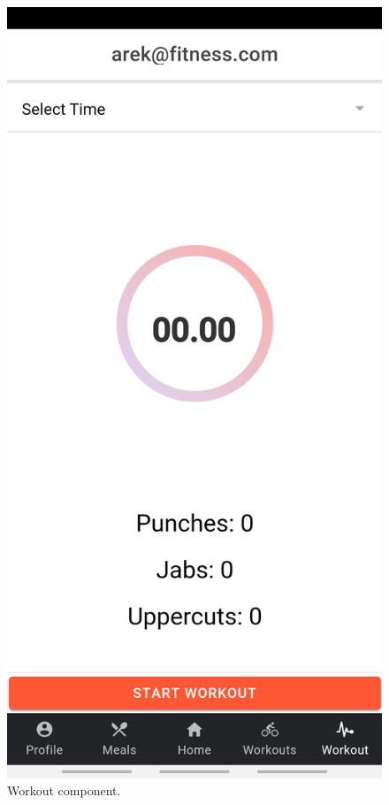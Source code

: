 \documentclass[a4paper,12pt]{report}
\begin{document}
\begin{figure}[ht]
\begin{minipage}[b]{0.5\linewidth}
    \includegraphics[width=.7\linewidth]{images/aplicationImages/workout.jpg} 
    \caption{Workout component.} 
    \vspace{4ex}
  \end{minipage}
  \begin{minipage}[b]{0.5\linewidth}
    \centering

\end{minipage}
\end{figure}
\end{document}
